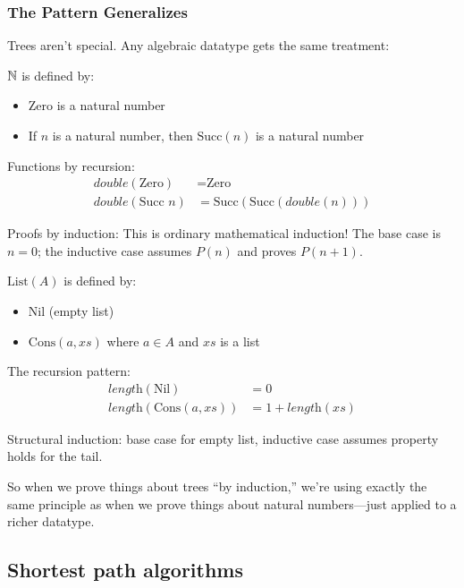 \subsubsection*{The Pattern Generalizes}

Trees aren't special. Any algebraic datatype gets the same treatment:

\begin{example}
$\mathbb{N}$ is defined by:
\begin{itemize}
  \item $\text{Zero}$ is a natural number
  \item If $n$ is a natural number, then $\text{Succ}(n)$ is a natural number
\end{itemize}

Functions by recursion:
\begin{align*}
\textit{double}(\text{Zero}) &= \text{Zero} \\
\textit{double}(\text{Succ } n) &= \text{Succ}(\text{Succ}(\textit{double}(n)))
\end{align*}

Proofs by induction: This is ordinary mathematical induction! The base case is $n = 0$; the inductive case assumes $P(n)$ and proves $P(n+1)$.
\end{example}

\begin{example}[Lists]
$\text{List}(A)$ is defined by:
\begin{itemize}
  \item $\text{Nil}$ (empty list)
  \item $\text{Cons}(a, \mathit{xs})$ where $a \in A$ and $\mathit{xs}$ is a list
\end{itemize}

The recursion pattern:
\begin{align*}
\textit{length}(\text{Nil}) &= 0 \\
\textit{length}(\text{Cons}(a, \mathit{xs})) &= 1 + \textit{length}(\mathit{xs})
\end{align*}

Structural induction: base case for empty list, inductive case assumes property holds for the tail.
\end{example}

So when we prove things about trees ``by induction,'' we're using exactly the same principle as when we prove things about natural numbers---just applied to a richer datatype.

\subsection*{Shortest path algorithms}

